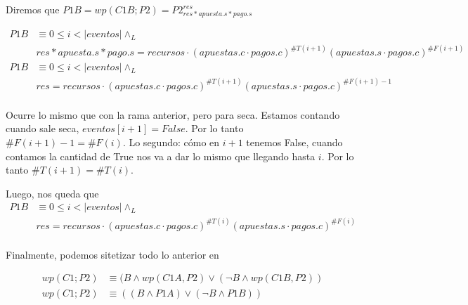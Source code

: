 \documentclass[../document.tex]{subfiles}
\begin{document}
Diremos que $P1B = wp(C1B;P2) = P2^{res}_{res * apuesta.s * pago.s}$

\begin{equation} \label{eq2.b}
\begin{split}
P1B & \equiv 0\leq i < |eventos| \land_L \\& res * apuesta.s * pago.s = recursos \cdot (apuestas.c\cdot pagos.c)^{\#T(i+1)}(apuestas.s\cdot pagos.c)^{\#F(i+1)}\\
P1B & \equiv 0\leq i < |eventos| \land_L \\& res = recursos \cdot (apuestas.c\cdot pagos.c)^{\#T(i+1)}(apuestas.s\cdot pagos.c)^{\#F(i+1)-1}\\
\end{split}
\end{equation}

Ocurre lo mismo que con la rama anterior, pero para seca.
Estamos contando cuando sale seca, $eventos[i+1] = False$. Por lo tanto $\#F(i+1)-1=\#F(i)$. Lo segundo: cómo en $i+1$ tenemos False, cuando contamos la cantidad de True nos va a dar lo mismo que llegando hasta $i$. Por lo tanto $\#T(i+1)=\#T(i)$.

Luego, nos queda que
\begin{equation}
    \begin{split}
    P1B & \equiv 0\leq i < |eventos| \land_L \\& res = recursos \cdot (apuestas.c\cdot pagos.c)^{\#T(i)}(apuestas.s\cdot pagos.c)^{\#F(i)}\\
    \end{split}
\end{equation}

Finalmente, podemos sitetizar todo lo anterior en

\begin{equation} \label{final}
\begin{split}
    wp(C1;P2) &\equiv (B \land wp(C1A, P2) \lor (\neg B \land wp(C1B, P2))\\
    wp(C1;P2) &\equiv ((B \land P1A) \lor (\neg B \land P1B))\\
\end{split}
\end{equation}

\end{document}
